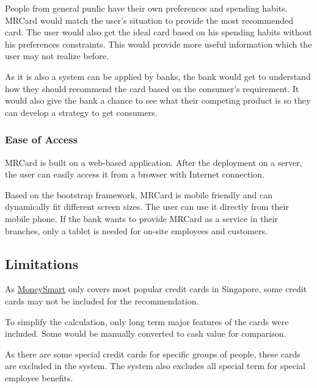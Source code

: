 	People from general punlic have their own preferences and spending habits. MRCard would match the user's situation to provide the most recommended card. The user would also get the ideal card based on his spending habits without his preferences constraints. This would provide more useful information which the user may not realize before.

	As it is also a system can be applied by banks, the bank would get to understand how they should recommend the card based on the consumer's requirement. It would also give the bank a chance to see what their competing product is so they can develop a strategy to get consumers.


	\subsubsection{Ease of Access} %
	\label{ssub:ease_of_access}

	MRCard is built on a web-based application. After the deployment on a server, the user can easily access it from a browser with Internet connection.

	Based on the bootstrap framework, MRCard is mobile friendly and can dynamically fit different screen sizes. The user can use it directly from their mobile phone. If the bank wants to provide MRCard as a service in their branches, only a tablet is needed for on-site employees and customers.



\subsection{Limitations} %
\label{sub:limitations}

As \href{https://www.moneysmart.sg/credit-cards}{MoneySmart} only covers most popular credit cards in Singapore, some credit cards may not be included for the recommendation.

To simplify the calculation, only long term major features of the cards were included. Some would be manually converted to cash value for comparison.

As there are some special credit cards for specific groups of people, these cards are excluded in the system. The system also excludes all special term for special employee benefits.

